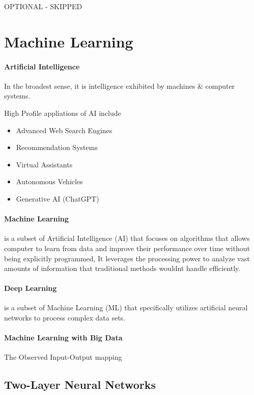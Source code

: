 \documentclass{article}
\theoremstyle{definition}
\theoremstyle{remark}
\begin{document}
OPTIONAL - SKIPPED

\section{Machine Learning}

\paragraph{Artificial Intelligence}
In the broadest sense, it is intelligence exhibited by machines \& computer systems.

High Profile appliations of AI include 

\begin{itemize}
    \item Advanced Web Search Engines
    \item Recommendation Systems
    \item Virtual Assistants
    \item Autonomous Vehicles
    \item Generative AI (ChatGPT)
\end{itemize}

\paragraph{Machine Learning} 
is a subset of Artificial Intelligence (AI) that focuses on algorithms that allows computer to learn from data and improve their performance over time without being explicitly programmed, It leverages the processing power to analyze vast amounts of information that traditional methods wouldnt handle efficiently.

\paragraph{Deep Learning}
is a subset of Machine Learning (ML) that specifically utilizes artificial neural networks to process complex data sets. 

\paragraph{Machine Learning with Big Data}

The Observed Input-Output mapping 

\subsection{Two-Layer Neural Networks}
\end{document}

